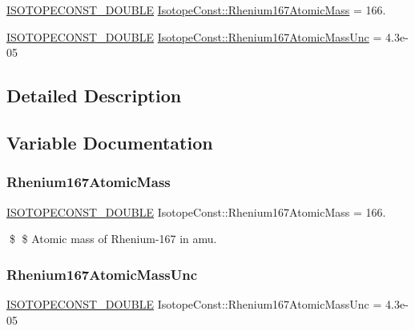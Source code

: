 \begin{DoxyCompactItemize}
\item 
\mbox{\hyperlink{group___isotope_const-_macros_ga8f45a7272ce02c0b4c65c44636ed719a}{I\+S\+O\+T\+O\+P\+E\+C\+O\+N\+S\+T\+\_\+\+D\+O\+U\+B\+LE}} \mbox{\hyperlink{group___isotope_const-_rhenium-_re167_ga7b002b01af2228ab3a3a8c3aa0f7f318}{Isotope\+Const\+::\+Rhenium167\+Atomic\+Mass}} = 166.
\item 
\mbox{\hyperlink{group___isotope_const-_macros_ga8f45a7272ce02c0b4c65c44636ed719a}{I\+S\+O\+T\+O\+P\+E\+C\+O\+N\+S\+T\+\_\+\+D\+O\+U\+B\+LE}} \mbox{\hyperlink{group___isotope_const-_rhenium-_re167_gae06a10ba538295a0b3c75ab1c723eb96}{Isotope\+Const\+::\+Rhenium167\+Atomic\+Mass\+Unc}} = 4.\+3e-\/05
\end{DoxyCompactItemize}


\subsection{Detailed Description}


\subsection{Variable Documentation}
\mbox{\label{group___isotope_const-_rhenium-_re167_ga7b002b01af2228ab3a3a8c3aa0f7f318}} 
\subsubsection{\texorpdfstring{Rhenium167\+Atomic\+Mass}{Rhenium167AtomicMass}}
{\footnotesize\ttfamily \mbox{\hyperlink{group___isotope_const-_macros_ga8f45a7272ce02c0b4c65c44636ed719a}{I\+S\+O\+T\+O\+P\+E\+C\+O\+N\+S\+T\+\_\+\+D\+O\+U\+B\+LE}} Isotope\+Const\+::\+Rhenium167\+Atomic\+Mass = 166.}

\$ \$ Atomic mass of Rhenium-\/167 in amu. \mbox{\label{group___isotope_const-_rhenium-_re167_gae06a10ba538295a0b3c75ab1c723eb96}} 
\subsubsection{\texorpdfstring{Rhenium167\+Atomic\+Mass\+Unc}{Rhenium167AtomicMassUnc}}
{\footnotesize\ttfamily \mbox{\hyperlink{group___isotope_const-_macros_ga8f45a7272ce02c0b4c65c44636ed719a}{I\+S\+O\+T\+O\+P\+E\+C\+O\+N\+S\+T\+\_\+\+D\+O\+U\+B\+LE}} Isotope\+Const\+::\+Rhenium167\+Atomic\+Mass\+Unc = 4.\+3e-\/05}

